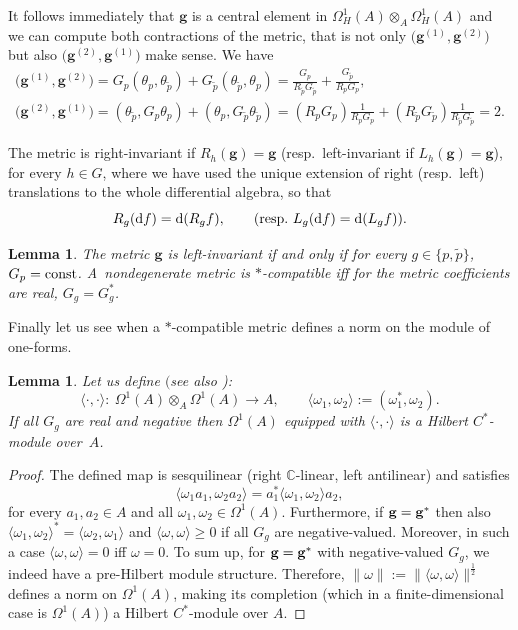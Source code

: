 \documentclass[pdftex]{sigma}
\numberwithin{equation}{section}
\newtheorem{Lemma}[Theorem]{Lemma}
\newcommand{\C}{\mathbb{C}}
\newcommand{\ip}{{\tilde{p}}}
\begin{document}
It follows immediately that $\mathbf{g}$ is a central element in $\Omega^1_H(A) \otimes_A \Omega^1_H(A)$ and
we can compute both contractions of the metric, that is not only $ \big(\mathbf{g}^{(1)},\mathbf{g}^{(2)}\big)$
but also $ \big(\mathbf{g}^{(2)},\mathbf{g}^{(1)}\big)$ make sense.
We have
\begin{gather}
\big(\mathbf{g}^{(1)},\mathbf{g}^{(2)}\big)=G_p(\theta_p,\theta_{\ip})+G_\ip(\theta_\ip,\theta_p)=\frac{G_p}{R_\ip G_\ip}+\frac{G_\ip}{R_{p} G_p}, \nonumber\\
\big(\mathbf{g}^{(2)},\mathbf{g}^{(1)}\big)=(\theta_\ip,G_p\theta_p)+(\theta_p,G_\ip\theta_{\ip})=(R_pG_p)\frac{1}{R_pG_p}+(R_\ip G_\ip)\frac{1}{R_\ip G_\ip}=2.\label{metric-short}
\end{gather}

\begin{Definition}
The metric is right-invariant if $R_{{h}}(\mathbf{g}) = \mathbf{g}$ (resp.\ left-invariant if $L_{{h}}(\mathbf{g}) = \mathbf{g}$),
for every $h\in G$, where we have used the unique extension of right (resp.\ left) translations to the whole differential algebra, so that
\[ R_g({\rm d}f)={\rm d}(R_gf), \qquad (\mathrm{resp.} \ L_g({\rm d}f)={\rm d}(L_gf)).\]
\end{Definition}

\begin{Lemma}The metric $\mathbf{g}$ is left-invariant if and only if for every $g\in\{p,\ip\}$, $G_p={\rm const}$. A~nondegenerate
metric is $\ast$-compatible iff for the metric coefficients are real, $G_g=G_g^\ast$.
\end{Lemma}

Finally let us see when a $*$-compatible metric defines a norm on the module of one-forms.

\begin{Lemma}\label{Hilbert}
Let us define $($see also {\rm \cite[Proposition~8.40]{BM_book})}:
\[ \langle \cdot, \cdot \rangle \colon \ \Omega^1(A)\otimes_A\Omega^1(A)\rightarrow A,
\qquad \langle \omega_1, \omega_2 \rangle:=(\omega_1^\ast,\omega_2). \]
If all $G_g$ are real and negative then $\Omega^1(A)$ equipped with $\langle \cdot,\cdot\rangle$ is a Hilbert $C^\ast$-module over~$A$.
\end{Lemma}
\begin{proof}
The defined map is sesquilinear (right $\C$-linear, left antilinear) and satisfies
\[ \langle \omega_1 a_1, \omega_2 a_2 \rangle= a_1^* \langle \omega_1,\omega_2\rangle a_2,\]
for every $a_1,a_2 \in A$ and all $\omega_{1},\omega_2\in\Omega^1(A)$.
Furthermore, if ${\bf g}={\bf g}^\ast$ then also $\langle \omega_1, \omega_2\rangle^\ast = \langle \omega_2, \omega_1\rangle$ and $\langle \omega,\omega\rangle \ge 0$ if all $G_g$
are negative-valued. Moreover, in such a case $\langle \omega,\omega\rangle=0$ iff $\omega=0$. To sum up, for ${\bf g}={\bf g}^*$ with negative-valued $G_g$, we indeed
have a pre-Hilbert module structure. Therefore, $\|\omega\|:=\|\langle \omega, \omega\rangle\|^{\frac{1}{2}}$ defines a norm on $\Omega^1(A)$,
making its completion (which in a finite-dimensional case is $\Omega^1(A)$) a
Hilbert $C^\ast$-module over $A$.
\end{proof}
\end{document}
